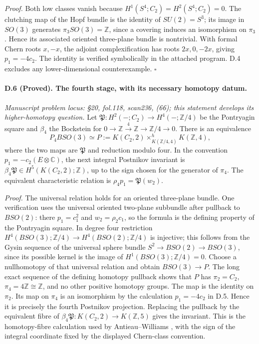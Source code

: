 \emph{Proof.} Both low classes vanish because $H^1(S^4;C_2)=H^2(S^4;C_2)=0$. The clutching map of the Hopf bundle is the identity of $SU(2)=S^3$; its image in $SO(3)$ generates $\pi_3SO(3)=\mathbb Z$, since a covering induces an isomorphism on $\pi_3$. Hence its associated oriented three-plane bundle is nontrivial. With formal Chern roots $x,-x$, the adjoint complexification has roots $2x,0,-2x$, giving $p_1=-4c_2$. The identity is verified symbolically in the attached program. D.4 excludes any lower-dimensional counterexample. \hfill$\square$

\paragraph{D.6 (Proved). The fourth stage, with its necessary homotopy datum.}
\emph{Manuscript problem locus: \S20, fol.118, scan236, (66); this statement develops its higher-homotopy question.}
Let $\mathfrak P:H^2(-;C_2)\to H^4(-;\mathbb Z/4)$ be the Pontryagin square and $\beta_4$ the Bockstein for $0\to\mathbb Z\xrightarrow4\mathbb Z\to\mathbb Z/4\to0$. There is an equivalence
\[
P_4BSO(3)\simeq P:=
K(C_2,2)\mathop{\times}^{h}_{K(\mathbb Z/4,4)}K(\mathbb Z,4),
\]
where the two maps are $\mathfrak P$ and reduction modulo four. In the convention $p_1=-c_2(E\otimes\mathbb C)$, the next integral Postnikov invariant is $\beta_4\mathfrak P\in H^5(K(C_2,2);\mathbb Z)$, up to the sign chosen for the generator of $\pi_4$. The equivalent characteristic relation is
$\rho_4p_1=\mathfrak P(w_2)$.

\emph{Proof.} The universal relation holds for an oriented three-plane bundle. One verification uses the universal oriented two-plane subbundle after pullback to $BSO(2)$: there $p_1=c_1^2$ and $w_2=\rho_2c_1$, so the formula is the defining property of the Pontryagin square. In degree four restriction $H^4(BSO(3);\mathbb Z/4)\to H^4(BSO(2);\mathbb Z/4)$ is injective; this follows from the Gysin sequence of the universal sphere bundle $S^2\to BSO(2)\to BSO(3)$, since its possible kernel is the image of $H^1(BSO(3);\mathbb Z/4)=0$. Choose a nullhomotopy of that universal relation and obtain $BSO(3)\to P$. The long exact sequence of the defining homotopy pullback shows that $P$ has $\pi_2=C_2$, $\pi_4=4\mathbb Z\cong\mathbb Z$, and no other positive homotopy groups. The map is the identity on $\pi_2$. Its map on $\pi_4$ is an isomorphism by the calculation $p_1=-4c_2$ in D.5. Hence it is precisely the fourth Postnikov projection. Replacing the pullback by the equivalent fibre of $\beta_4\mathfrak P:K(C_2,2)\to K(\mathbb Z,5)$ gives the invariant. This is the homotopy-fibre calculation used by Antieau--Williams \cite{AntieauWilliams2014}, with the sign of the integral coordinate fixed by the displayed Chern-class convention.

